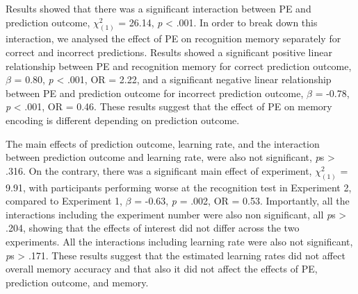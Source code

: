 \documentclass[a4paper,12pt]{article}
\begin{document}
 Results showed that there was a significant interaction between PE and prediction outcome, $\chi^2_{(1)}$ = 26.14, \textit{p} < .001. In order to break down this interaction, we analysed the effect of PE on recognition memory separately for correct and incorrect predictions. Results showed a significant positive linear relationship between PE and recognition memory for correct prediction outcome, $\beta$ = 0.80, \textit{p} < .001, OR = 2.22, and a significant negative linear relationship between PE and prediction outcome for incorrect prediction outcome, $\beta$ = -0.78, \textit{p} < .001, OR = 0.46.
These results suggest that the effect of PE on memory encoding is different depending on prediction outcome. \par
The main effects of prediction outcome, learning rate, and the interaction between prediction outcome and learning rate, were also not significant, \textit{p}s > .316. On the contrary, there was a significant main effect of experiment, $\chi^2_{(1)}$ = 9.91, with participants performing worse at the recognition test in Experiment 2, compared to Experiment 1, $\beta$ = -0.63, \textit{p} = .002, OR = 0.53. Importantly, all the interactions including the experiment number were also non significant, all \textit{p}s > .204, showing that the effects of interest did not differ across the two experiments. All the interactions including learning rate were also not significant, \textit{p}s > .171. These results suggest that the estimated learning rates did not affect overall memory accuracy and that also it did not affect the effects of PE, prediction outcome, and memory.\par
\end{document}
